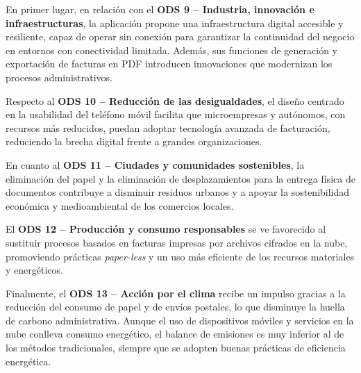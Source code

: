 \begin{large}
En primer lugar, en relación con el \textbf{ODS 9 – Industria, innovación e infraestructuras}, la aplicación propone una infraestructura digital accesible y resiliente, capaz de operar sin conexión para garantizar la continuidad del negocio en entornos con conectividad limitada. Además, sus funciones de generación y exportación de facturas en PDF introducen innovaciones que modernizan los procesos administrativos. 

Respecto al \textbf{ODS 10 – Reducción de las desigualdades}, el diseño centrado en la usabilidad del teléfono móvil facilita que microempresas y autónomos, con recursos más reducidos, puedan adoptar tecnología avanzada de facturación, reduciendo la brecha digital frente a grandes organizaciones. 

En cuanto al \textbf{ODS 11 – Ciudades y comunidades sostenibles}, la eliminación del papel y la eliminación de desplazamientos para la entrega física de documentos contribuye a disminuir residuos urbanos y a apoyar la sostenibilidad económica y medioambiental de los comercios locales. 

El \textbf{ODS 12 – Producción y consumo responsables} se ve favorecido al sustituir procesos basados en facturas impresas por archivos cifrados en la nube, promoviendo prácticas \textit{paper-less} y un uso más eficiente de los recursos materiales y energéticos. 

Finalmente, el \textbf{ODS 13 – Acción por el clima} recibe un impulso gracias a la reducción del consumo de papel y de envíos postales, lo que disminuye la huella de carbono administrativa. Aunque el uso de dispositivos móviles y servicios en la nube conlleva consumo energético, el balance de emisiones es muy inferior al de los métodos tradicionales, siempre que se adopten buenas prácticas de eficiencia energética.
\end{large}